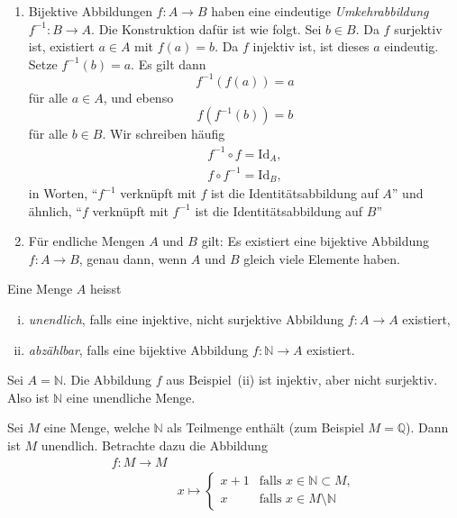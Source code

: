 \documentclass[../main.tex]{subfiles}
\begin{document}
\begin{remark}
  \leavevmode
  \begin{enumerate}[(1)]
    \item Bijektive Abbildungen $f \colon A \to B$ haben eine eindeutige \textit{Umkehrabbildung}
      $f^{-1} \colon B \to A$. Die Konstruktion dafür ist wie folgt. Sei $b \in B$.
      Da $f$ surjektiv ist, existiert $a \in A$ mit $f(a) = b$. Da $f$
      injektiv ist, ist dieses $a$ eindeutig. Setze $f^{-1}(b) = a$. Es gilt dann
      \[f^{-1}(f(a)) = a\]
      für alle $a \in A$, und ebenso
      \[f(f^{-1}(b)) = b\]
      für alle $b \in B$. Wir schreiben häufig
      \begin{align*}
        f^{-1} \circ f = \textrm{Id}_{A}, \\
        f \circ f^{-1} = \textrm{Id}_{B},
      \end{align*}
      in Worten, ``$f^{-1}$ verknüpft mit $f$ ist die Identitätsabbildung auf $A$''
      und ähnlich, ``$f$ verknüpft mit $f^{-1}$ ist die Identitätsabbildung auf $B$''
    \item Für endliche Mengen $A$ und $B$ gilt: Es existiert eine bijektive Abbildung
      $f: A \to B$, genau dann, wenn $A$ und $B$ gleich viele Elemente haben.
  \end{enumerate}
\end{remark}

\begin{definition}
  Eine Menge $A$ heisst
  \begin{enumerate}[(i)]
    \item \textit{unendlich}, falls eine injektive, nicht surjektive Abbildung
      $f: A \to A$ existiert,
    \item \textit{abzählbar}, falls eine bijektive Abbildung $f \colon \mathbb N \to A$
      existiert.
  \end{enumerate}
\end{definition}

\begin{example}
  Sei $A = \mathbb N$. Die Abbildung $f$ aus Beispiel~(ii) ist injektiv,
  aber nicht surjektiv. Also ist $\mathbb N$ eine unendliche Menge.
\end{example}

\begin{example}
  Sei $M$ eine Menge, welche $\mathbb N$ als Teilmenge enthält
  (zum Beispiel $M = \mathbb Q$).
  Dann ist $M$ unendlich. Betrachte dazu die Abbildung
  \begin{align*}
    f \colon M \to M \\
    & x \mapsto
      \begin{cases}
        x+1 & \mbox{falls }x \in \mathbb N \subset M, \\
        x & \mbox{falls }x \in M \setminus \mathbb N
      \end{cases}
  \end{align*}
\end{example}
\end{document}
